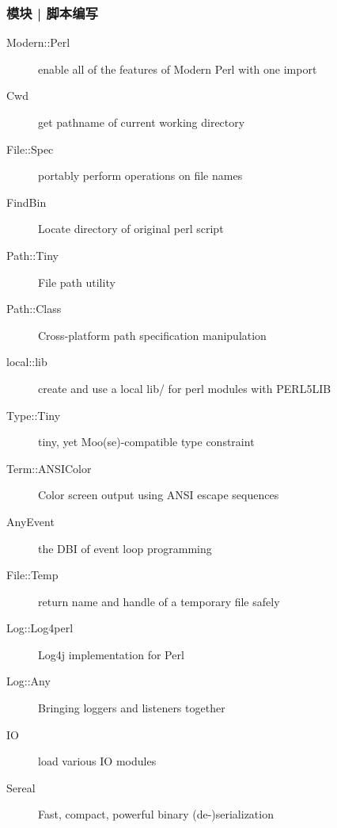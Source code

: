 \begin{frame}
  \frametitle{模块 | 脚本编写}
    \begin{description}
      \item[Modern::Perl] enable all of the features of Modern Perl with one import
      \item[Cwd] get pathname of current working directory
      \item[File::Spec] portably perform operations on file names
      \item[FindBin] Locate directory of original perl script
      \item[Path::Tiny] File path utility
      \item[Path::Class] Cross-platform path specification manipulation
      \item[local::lib] create and use a local lib/ for perl modules with PERL5LIB
      \item[Type::Tiny] tiny, yet Moo(se)-compatible type constraint
      \item[Term::ANSIColor] Color screen output using ANSI escape sequences
      \item[AnyEvent] the DBI of event loop programming
      \item[File::Temp] return name and handle of a temporary file safely
      \item[Log::Log4perl] Log4j implementation for Perl
      \item[Log::Any] Bringing loggers and listeners together
      \item[IO] load various IO modules
      \item[Sereal] Fast, compact, powerful binary (de-)serialization
    \end{description}
\end{frame}

